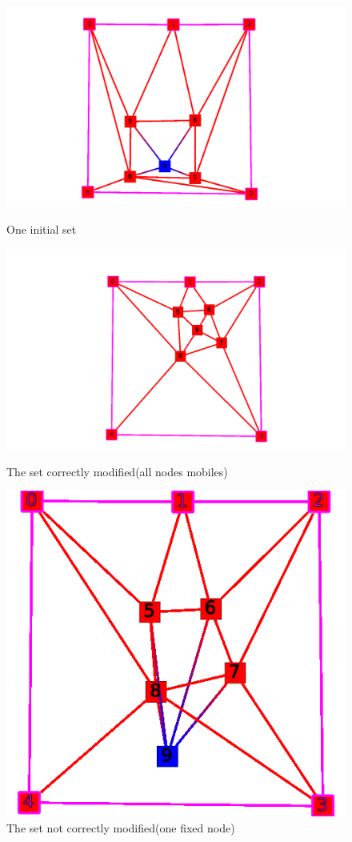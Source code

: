 \begin{figure}[!h]
\centering
\includegraphics[scale=0.5]{snapshots/constate_fix_init.png}
\caption{One initial set}
\includegraphics[scale=0.5]{snapshots/constate_nikel.png}
\caption{The set correctly modified(all nodes mobiles)}
\includegraphics[scale=0.5]{snapshots/constate_probleme.png}
\caption{The set not correctly modified(one fixed node)}
\end{figure}
